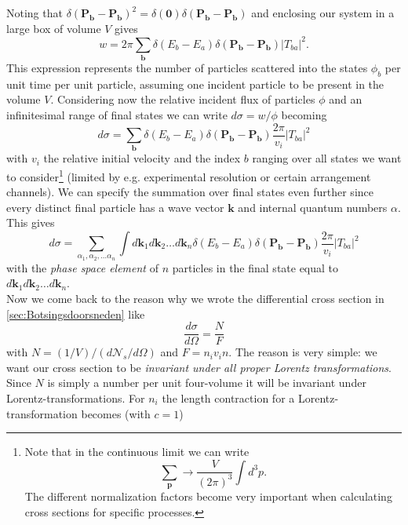 \documentclass[11pt]{article}
\numberwithin{equation}{section}
\begin{document}
Noting that $\delta(\mathbf{P_b} - \mathbf{P_b})^2=\delta(\mathbf{0})\delta(\mathbf{P_b} - \mathbf{P_b})$ and enclosing our system in a large box of volume $V$ gives
\begin{equation}
	w = 2 \pi \underset{\mathbf{b}} \sum \delta(E_b-E_a)\delta(\mathbf{P_b} - \mathbf{P_b}) |T_{ba}|^2.
\end{equation}
This expression represents the number of particles scattered into the states $\phi_b$ per unit time per unit particle, assuming one incident particle to be present in the volume $V$. Considering now the relative incident flux of particles $\phi$ and an infinitesimal range of final states we can write $d\sigma = w/\phi$ becoming\begin{equation}
	d\sigma = \underset{\mathbf{b}} \sum \delta(E_b-E_a)\delta(\mathbf{P_b} - \mathbf{P_b}) \frac{2\pi}{v_i}|T_{ba}|^2
\end{equation}
with $v_i$ the relative initial velocity and the index $b$ ranging over all states we want to consider\footnote{Note that in the continuous limit we can write
\begin{equation}
	\underset{\mathbf{p}}\sum \rightarrow \frac{V}{(2\pi)^3} \int d^3 p.
\end{equation}
The different normalization factors become very important when calculating cross sections for specific processes.}
 (limited by e.g. experimental resolution or certain arrangement channels). We can specify the summation over final states even further since every distinct final particle has a wave vector $\mathbf{k}$ and internal quantum numbers $\alpha$. This gives
\begin{equation}\label{crosssection}
	d\sigma = \underset{\alpha_1, \alpha_2, \ldots \alpha_n} \sum \int d\mathbf{k}_1 d\mathbf{k}_2 \ldots d\mathbf{k}_n \delta(E_b-E_a)\delta(\mathbf{P_b} - \mathbf{P_b}) \frac{2\pi}{v_i}|T_{ba}|^2
\end{equation}
with the \emph{phase space element} of $n$ particles in the final state equal to $d\mathbf{k}_1 d\mathbf{k}_2 \ldots d\mathbf{k}_n$.\\
Now we come back to the reason why we wrote the differential cross section in \ref{sec:Botsingsdoorsneden} like
\begin{equation}
\frac{d\sigma}{d\Omega} = \frac{N}{F}	
\end{equation}
with $N = (1/V)/(d\mathcal{N}_s/d\Omega)$ and $F = n_i v_i n$. The reason is very simple: we want our cross section to be \emph{invariant under all proper Lorentz transformations}. Since $N$ is simply a number per unit four-volume it will be invariant under Lorentz-transformations. For $n_i$ the length contraction for a Lorentz-transformation becomes (with $c = 1$)
\end{document}
